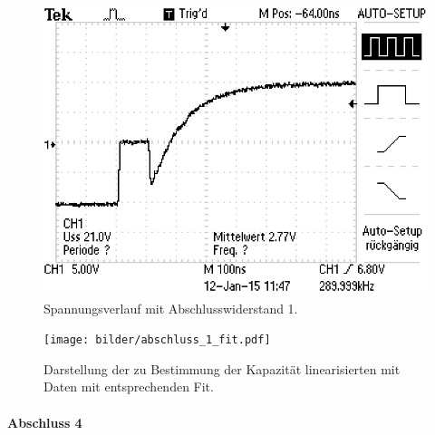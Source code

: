 \begin{figure}[htpb]
  \centering
  \includegraphics[scale=1.0]{bilder/abschluss/F0005TEK.JPG}
  \caption{Spannungsverlauf mit Abschlusswiderstand 1.}
  \label{fig:abschluss_1}
\end{figure}

\begin{figure}[htpb]
  \centering
  \texttt{[image: bilder/abschluss\_1\_fit.pdf]}
  \caption{Darstellung der zu Bestimmung der Kapazität linearisierten mit Daten
  mit entsprechenden Fit.}
  \label{fig:abschluss_1_fit}
\end{figure}

\clearpage
\paragraph{Abschluss 4}
\label{ssub:abschluss_4}

